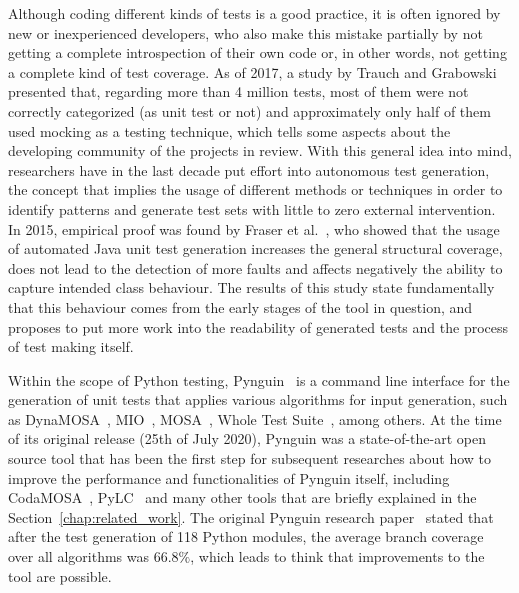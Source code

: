 \documentclass[%
  chapterprefix=false,%
  open=right,%
  twoside=true,%
  paper=a4,%
  logofile={Figures/logo.png},%
  thesistype=master,%
  UKenglish,%
]{se2thesis}
\begin{document}
Although coding different kinds of tests is a good practice, it is often ignored by new or inexperienced developers, who also make this mistake partially by not getting a complete introspection of their own code or, in other words, not getting a complete kind of test coverage.
As of 2017, a study by Trauch and Grabowski~\cite{DBLP:conf/icst/TrautschG17} presented that, regarding more than 4 million tests, most of them were not correctly categorized (as unit test or not) and approximately only half of them used mocking as a testing technique, which tells some aspects about the developing community of the projects in review.
With this general idea into mind, researchers have in the last decade put effort into autonomous test generation, the concept that implies the usage of different methods or techniques in order to identify patterns and generate test sets with little to zero external intervention.
In 2015, empirical proof was found by Fraser et al.~\cite{DBLP:journals/tosem/FraserSMAP15}, who showed that the usage of automated Java unit test generation increases the general structural coverage, does not lead to the detection of more faults and affects negatively the ability to capture intended class behaviour.
The results of this study state fundamentally that this behaviour  comes from the early stages of the tool in question, and proposes to put more work into the readability of generated tests and  the process of test making itself.

Within the scope of Python testing, Pynguin~\cite{DBLP:conf/icse/LukasczykF22} is a command line interface for the generation of unit tests that applies various algorithms for input generation, such as DynaMOSA~\cite{DBLP:journals/tse/PanichellaKT18}, MIO~\cite{DBLP:conf/ssbse/Arcuri17}, MOSA~\cite{DBLP:conf/icst/PanichellaKT15}, Whole Test Suite~\cite{DBLP:journals/tse/FraserA13}, among others.
At the time of its original release (25th of July 2020), Pynguin was a state-of-the-art open source tool that has been the first step for subsequent researches about how to improve the performance and functionalities of Pynguin itself, including CodaMOSA~\cite{DBLP:conf/icse/LemieuxILS23}, PyLC~\cite{DBLP:conf/sac/SalariEAS23} and many other tools that are briefly explained in the Section~\ref{chap:related_work}.
The original Pynguin research paper~\cite{DBLP:conf/icse/LukasczykF22} stated that after the test generation of 118 Python modules, the average branch coverage over all algorithms was $66.8\%$, which leads to think that improvements to the tool are possible.
\end{document}
